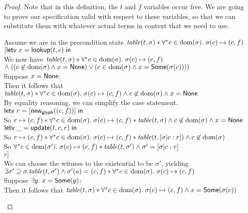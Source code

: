 \begin{proof}
Note that in this definition, the $t$ and $f$ variables occur free. We are going to 
prove our specification valid with respect to these variables, so that we can substitute
them with whatever actual terms in context that we need to use. 

\begin{tabbedproof}
\oo Assume we are in the precondition state $\mathit{table}(t, \sigma) * \forall^{*}c \in \mbox{dom}({\sigma}).\;\sigma(c) \mapsto (c,f)$ \\
\ooo $[\mathsf{letv}\;x = \mathsf{lookup}(t,c)\;\mathsf{in}\;$ \\
\ooo We now have $\mathit{table}(t, \sigma) * \forall^{*}c \in \mbox{dom}({\sigma}).\;\sigma(c) \mapsto (c,f)$  \\
\oox $\land\; ((c \not \in \mbox{dom}({\sigma}) \land x = \mathsf{None}) \vee (c \in \mbox{dom}({\sigma}) \land x = \mathsf{Some}(\sigma(c))))$ \\
\ooo Suppose $x = \mathsf{None}$:\\
\oooo Then it follows that $\mathit{table}(t, \sigma) * \forall^{*}c \in \mbox{dom}({\sigma}).\;\sigma(c) \mapsto (c,f) \land c \not \in \mbox{dom}({\sigma}) \land x = \mathsf{None}$\\
\oooo By equality reasoning, we can simplify the case statement. \\
\oooo $\mathsf{letv}\;r = [\mathsf{new}_{\mathsf{glyph}}((c,f))]\;\mathsf{in}\;$ \\
\oooo So $r \mapsto (c,f) * \forall^{*}c \in \mbox{dom}({\sigma}).\;\sigma(c) \mapsto (c,f) * \mathit{table}(t, \sigma) \land c \not \in \mbox{dom}({\sigma}) \land x = \mathsf{None}$\\
\oooo $\mathsf{letv}\;\_ = \mathsf{update}(t, c, r)\;\mathsf{in}\;$ \\
\oooo So $r \mapsto (c,f) * \forall^{*}c \in \mbox{dom}({\sigma}).\;\sigma(c) \mapsto (c,f) * \mathit{table}(t, [\sigma|c:r]) \land c \not \in \mbox{dom}({\sigma})$\\
\oooo So $\forall^{*}c \in \mbox{dom}({\sigma'}).\;\sigma(c) \mapsto (c,f) * \mathit{table}(t, \sigma') \land \sigma' = [\sigma|c:r]$\\
\oooo $r]$ \\
\oooo We can choose the witness to the existential to be $\sigma'$, yielding \\
\ooox $\exists \sigma' \supseteq \sigma. \mathit{table}(t, \sigma') \land \sigma'(a) = (c,f) * \forall^{*}c \in \mbox{dom}({\sigma}).\;\sigma(c) \mapsto (c,f)$ \\
\ooo Suppose $\exists y.\; x = \mathsf{Some}(y)$:  \\
\oooo Then it follows that $\mathit{table}(t, \sigma) * \forall^{*}c \in \mbox{dom}({\sigma}).\;\sigma(c) \mapsto (c,f) \land x = \mathsf{Some}(\sigma(c))$\\

\end{tabbedproof}
\end{proof}
